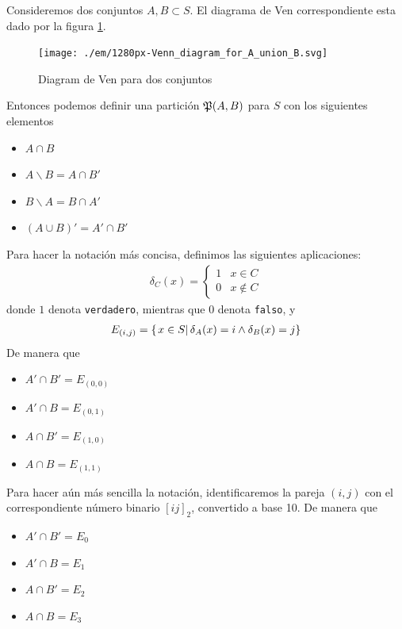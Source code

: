 Consideremos dos conjuntos $ A,B \subset S$. El diagrama de Ven correspondiente esta dado por la figura \ref{fig:1280px-venndiagramforaunionb}. 

\begin{figure}
	\centering
	\texttt{[image: ./em/1280px-Venn\_diagram\_for\_A\_union\_B.svg]}
	\caption{Diagram de Ven para dos conjuntos}
	\label{fig:1280px-venndiagramforaunionb}
\end{figure}

Entonces podemos definir una partición $ \mathfrak{P}(A,B) $ para $ S $ con los siguientes elementos
\begin{itemize}
	\item $ A\cap B $
	\item $ A\backslash B = A \cap B'$
	\item $ B\backslash A = B \cap A'$
	\item $ \left(A\cup B\right)' = A'\cap B' $
\end{itemize}

Para hacer la notación más concisa, definimos las siguientes aplicaciones:
\begin{align*}
	\delta_C(x) = \begin{cases}
		1 & x \in C \\
		0 & x \not \in C
	\end{cases}
\end{align*}
donde $ 1 $ denota \texttt{verdadero}, mientras que $ 0 $ denota \texttt{falso}, y
\begin{align*}
	E_{(i,j)}=\left\{ \left.x\in S \right| \delta_{A}(x)=i\wedge\delta_{B}(x)=j \right\}
\end{align*}
De manera que 
\begin{itemize}
	\item $ A' \cap B' = E_{(0,0)}$
	\item $ A'  \cap B = E_{(0,1)}$
	\item $ A \cap B'  = E_{(1,0)}$
	\item $ A  \cap B  = E_{(1,1)}$
\end{itemize}

Para hacer aún más sencilla la notación, identificaremos la pareja $ (i,j) $ con el correspondiente número binario $ [ij]_{2} $, convertido a base 10. De manera que 
\begin{itemize}
	\item $ A' \cap B' = E_{0}$
	\item $ A'  \cap B = E_{1}$
	\item $ A \cap B'  = E_{2}$
	\item $ A  \cap B  = E_{3}$
\end{itemize}

